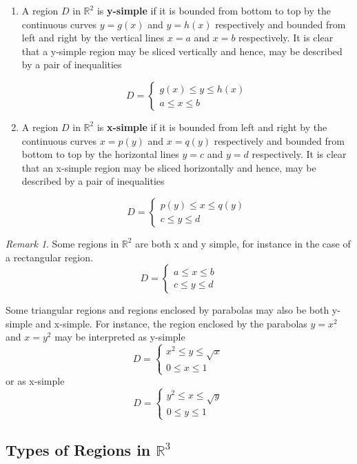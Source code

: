 \documentclass[11pt]{article}
\theoremstyle{plain} %
\theoremstyle{definition}
\theoremstyle{example}
\theoremstyle{remark}
\newtheorem*{remark}{Remark}
\begin{document}
\begin{enumerate}
	\item A region $D$ in $\mathbb R^2$ is \textbf{y-simple} if it is bounded from bottom to top by the continuous curves $y=g(x)$ and $y=h(x)$ respectively and bounded from left and right by the vertical lines $x=a$ and $x=b$ respectively. It is clear that a y-simple region may be sliced vertically and hence, may be described by a pair of inequalities
	
	$$D = \begin{cases}
		g(x) \leq y \leq h(x) \\
		a \leq x \leq b
	\end{cases}$$
	\item A region $D$ in $\mathbb R^2$ is \textbf{x-simple} if it is bounded from left and right by the continuous curves $x=p(y)$ and $x=q(y)$ respectively and bounded from bottom to top by the horizontal lines $y=c$ and $y=d$ respectively. It is clear that an x-simple region may be sliced horizontally and hence, may be described by a pair of inequalities
	
	$$D = \begin{cases}
		p(y) \leq x \leq q(y) \\
		c \leq y \leq d
	\end{cases}$$
	
\end{enumerate}

\begin{remark}
Some regions in $\mathbb R^2$ are both x and y simple, for instance in the case of a rectangular region.
$$D = \begin{cases}
		a \leq x \leq b \\
		c \leq y \leq d
	\end{cases}$$
	
	Some triangular regions and regions enclosed by parabolas may also be both y-simple and x-simple. For instance, the region enclosed by the parabolas $y=x^2$ and $x=y^2$ may be interpreted as y-simple
	$$D = \begin{cases}
		x^2 \leq y \leq \sqrt{x} \\
		0 \leq x \leq 1
	\end{cases}$$
	or as x-simple
	$$D = \begin{cases}
		y^2 \leq x \leq \sqrt{y} \\
		0 \leq y \leq 1
	\end{cases}$$
\end{remark}

\subsection{Types of Regions in $\mathbb R^3$}
\end{document}

